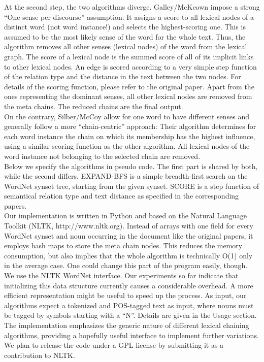 \documentclass[11pt, a4paper, abstraction]{scrartcl}
\begin{document}
At the second step, the two algorithms diverge. Galley/McKeown impose a strong ``One sense per discourse'' assumption: It assigns a score to all lexical nodes of a distinct word (not word instance!) and selects the highest-scoring one. This is assumed to be the most likely sense of the word for the whole text. Thus, the algorithm removes all other senses (lexical nodes) of the word from the lexical graph. The score of a lexical node is the summed score of all of its implicit links to other lexical nodes. An edge is scored according to a very simple step function of the relation type and the distance in the text between the two nodes. For details of the scoring function, please refer to the original paper. Apart from the ones representing the dominant senses, all other lexical nodes are removed from the meta chains. The reduced chains are the final output. \\
On the contrary, Silber/McCoy allow for one word to have different senses and generally follow a more ``chain-centric'' approach: Their algorithm determines for each word instance the chain on which its membership has the highest influence, using a similar scoring function as the other algorithm. All lexical nodes of the word instance not belonging to the selected chain are removed. \\
Below we specify the algorithms in pseudo code. The first part is shared by both, while the second differs. EXPAND-BFS is a simple breadth-first search on the WordNet synset tree, starting from the given synset. SCORE is a step function of semantical relation type and text distance as specified in the corresponding papers. \\

Our implementation is written in Python and based on the Natural Language Toolkit (NLTK, http://www.nltk.org). Instead of arrays with one field for every WordNet synset and noun occurring in the document like the original papers, it employs hash maps to store the meta chain nodes. This reduces the memory consumption, but also implies that the whole algorithm is technically O(1) only in the average case. One could change this part of the program easily, though. \\
We use the NLTK WordNet interface. Our experiments so far indicate that initializing this data structure currently causes a considerable overhead. A more efficient representation might be useful to speed up the process. As input, our algorithms expect a tokenized and POS-tagged text as input, where nouns must be tagged by symbols starting with a ``N''.  Details are given in the Usage section. The implementation emphasizes the generic nature of different lexical chaining algorithms, providing a hopefully useful interface to implement further variations. We plan to release the code under a GPL license by submitting it as a contribution to NLTK.
\end{document}
